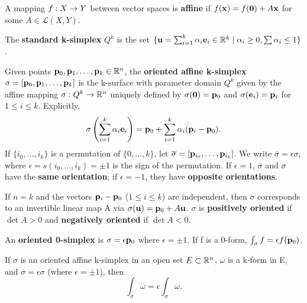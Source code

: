 \begin{definition}
  \label{def:chap10:affine_simplex}
  A mapping $f: X \to Y$ between vector spaces is \textbf{affine}
  if $f(\mathbf{x}) = f(\mathbf{0}) + A\mathbf{x}$ for some $A \in \mathcal{L}(X, Y)$.

  The \textbf{standard k-simplex} $Q^k$ is the set $\{ \mathbf{u} =
    \sum_{i=1}^k \alpha_i \mathbf{e}_i \in \mathbb{R}^k \mid \alpha_i \ge 0, \sum
  \alpha_i \le 1 \}$.

  Given points $\mathbf{p}_0, \mathbf{p}_1, \dots, \mathbf{p}_k \in \mathbb{R}^n$,
  the \textbf{oriented affine k-simplex} $\sigma = [\mathbf{p}_0,
  \mathbf{p}_1, \dots, \mathbf{p}_k]$ is the k-surface with parameter
  domain $Q^k$ given by the affine mapping $\sigma: Q^k \to \mathbb{R}^n$
  uniquely defined by $\sigma(\mathbf{0}) = \mathbf{p}_0$ and
  $\sigma(\mathbf{e}_i) = \mathbf{p}_i$ for $1 \le i \le k$. Explicitly,
  \[
    \sigma\left( \sum_{i=1}^k \alpha_i \mathbf{e}_i \right) =
    \mathbf{p}_0 + \sum_{i=1}^k \alpha_i (\mathbf{p}_i - \mathbf{p}_0).
  \]
  If $\{ i_0, \dots, i_k \}$ is a permutation of $\{ 0, \dots, k \}$,
  let $\overline{\sigma} = [\mathbf{p}_{i_0}, \dots, \mathbf{p}_{i_k}]$.
  We write $\overline{\sigma} = \epsilon \sigma$, where $\epsilon =
  s(i_0, \dots, i_k) = \pm 1$ is the sign of the permutation. If
  $\epsilon=1$, $\overline{\sigma}$ and $\sigma$ have the
  \textbf{same orientation}; if $\epsilon=-1$, they have
  \textbf{opposite orientations}.

  If $n=k$ and the vectors $\mathbf{p}_i - \mathbf{p}_0$ ($1 \le i \le
  k$) are independent, then $\sigma$ corresponds to an invertible
  linear map A via $\sigma(\mathbf{u}) = \mathbf{p}_0 + A\mathbf{u}$.
  $\sigma$ is \textbf{positively oriented} if $\det A > 0$ and
  \textbf{negatively oriented} if $\det A < 0$.

  An \textbf{oriented 0-simplex} is $\sigma = \epsilon \mathbf{p}_0$
  where $\epsilon = \pm 1$. If f is a 0-form, $\int_\sigma f =
  \epsilon f(\mathbf{p}_0)$.
\end{definition}

\begin{theorem}
  \label{thm:chap10:integral_reordered_simplex}
  If $\sigma$ is an oriented affine k-simplex in an open set $E
  \subset \mathbb{R}^n$, $\omega$ is a k-form in E, and $\overline{\sigma} =
  \epsilon \sigma$ (where $\epsilon = \pm 1$), then
  \[
    \int_{\overline{\sigma}} \omega = \epsilon \int_\sigma \omega.
  \]
\end{theorem}

